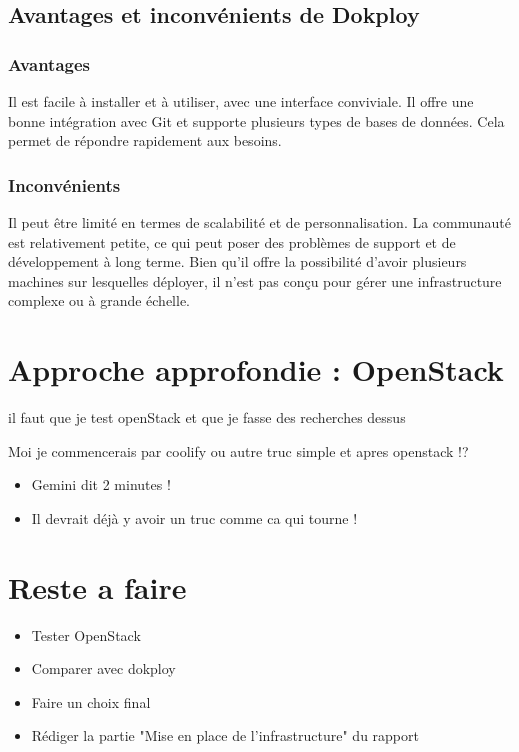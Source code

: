 \documentclass{report} %
\begin{document}
\subsection{Avantages et inconvénients de Dokploy}
\subsubsection{Avantages}
Il est facile à installer et à utiliser, avec une interface conviviale. Il offre une bonne intégration avec Git et supporte plusieurs types de bases de données.
Cela permet de répondre rapidement aux besoins.
\subsubsection{Inconvénients}
Il peut être limité en termes de scalabilité et de personnalisation. La communauté est relativement petite, ce qui peut poser des problèmes de support et de développement à long terme.
Bien qu'il offre la possibilité d'avoir plusieurs machines sur lesquelles déployer, il n'est pas conçu pour gérer une infrastructure complexe ou à grande échelle.

\section{Approche approfondie : OpenStack}
il faut que je test openStack et que je fasse des recherches dessus


{\color{red} 
Moi je commencerais par coolify ou autre truc simple et apres openstack !?

\begin{itemize}
\item Gemini dit 2 minutes ! 
\item Il devrait déjà y avoir un truc comme ca qui tourne !
\end{itemize}
}

\section{Reste a faire}
\begin{itemize}
\item Tester OpenStack
\item Comparer avec dokploy
\item Faire un choix final
\item Rédiger la partie "Mise en place de l'infrastructure" du rapport
\end{itemize}



\end{document}
